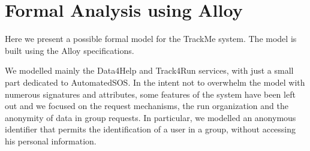 \chapter{Formal Analysis using Alloy}

Here we present a possible formal model for the TrackMe system. The model is built using the Alloy specifications.

We modelled mainly the Data4Help and Track4Run services, with just a small part dedicated to AutomatedSOS. In the intent not to overwhelm the model with numerous signatures and attributes, some features of the system have been left out and we focused on the request mechanisms, the run organization and the anonymity of data in group requests.
In particular, we modelled an anonymous identifier that permits the identification of a user in a group, without accessing his personal information.

